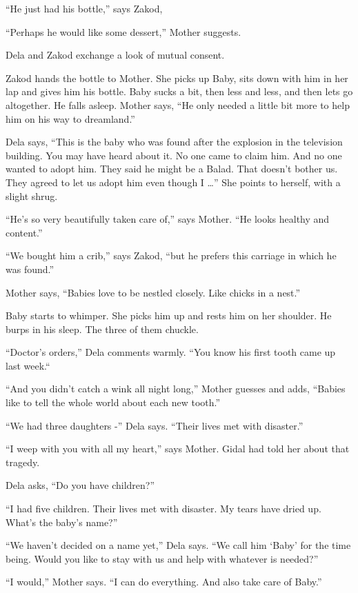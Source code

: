 \documentclass[twoside,11pt]{book}
\begin{document}
``He just had his bottle,'' says Zakod,

``Perhaps he would like some dessert,'' Mother suggests.

Dela and Zakod exchange a look of mutual consent.

Zakod hands the bottle to Mother. She picks up Baby, sits down with him in her lap and gives him his bottle. Baby sucks
a bit, then less and less, and then lets go altogether. He falls asleep. Mother says, ``He only needed a
little bit more to help him on his way to dreamland.''

Dela says, ``This is the baby who was found after the explosion in the television building. You may have
heard about it. No one came to claim him. And no one wanted to adopt him. They said he might be a Balad. That doesn't
bother us. They agreed to let us adopt him even though I {\dots}'' She points to herself, with a slight
shrug.

``He's so very beautifully taken care of,'' says Mother. ``He looks healthy and
content.''

``We bought him a crib,'' says Zakod, ``but he prefers this carriage in which he
was found.''

Mother says, ``Babies love to be nestled closely. Like chicks in a nest.''

Baby starts to whimper. She picks him up and rests him on her shoulder.  He burps in his sleep. The three of them
chuckle.

``Doctor's orders,'' Dela comments warmly. ``You know his first tooth came up
last week.``

``And you didn't catch a wink all night long,'' Mother guesses and adds, ``Babies
like to tell the whole world about each new tooth.''

``We had three daughters -'' Dela says. ``Their lives met with
disaster.''

``I weep with you with all my heart,'' says Mother. Gidal had told her about that tragedy.

Dela asks, ``Do you have children?''

``I had five children. Their lives met with disaster. My tears have dried up. What's the baby's
name?''

``We haven't decided on a name yet,'' Dela says. ``We call him `Baby' for the
time being. Would you like to stay with us and help with whatever is needed?''

``I would,'' Mother says. ``I can do everything. And also take care of
Baby.''
\end{document}

